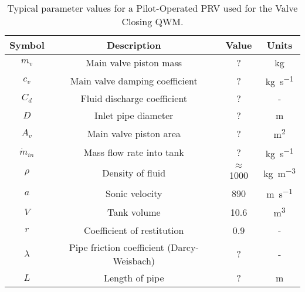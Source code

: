 \begin{table}[ht]
    \centering
    \begin{tabular}{c|c|c|c}
        Symbol & Description & Value & Units \\ \hline \hline
        $m_v$ & Main valve piston mass & ? & \si{kg} \\ \hline %
        $c_v$ & Main valve damping coefficient & ? & \si{kg.s^{-1}} \\ \hline %
        $C_d$ & Fluid discharge coefficient & ? & - \\ \hline %
        $D$ & Inlet pipe diameter & ? & \si{m} \\ \hline %
        $A_v$ & Main valve piston area & ? & \si{m^2} \\ \hline
        $\dot{m}_{in}$ & Mass flow rate into tank & ? & \si{kg.s^{-1}} \\ \hline %
        $\rho$ & Density of fluid & $\approx$1000 & \si{kg.m^{-3}} \\ \hline %
        $a$ & Sonic velocity & 890 & \si{m.s^{-1}} \\ \hline %
        $V$ & Tank volume & 10.6 & \si{m^3} \\ \hline %
        $r$ & Coefficient of restitution & 0.9 & - \\ \hline %
        $\lambda$ & Pipe friction coefficient (Darcy-Weisbach) & ? & - \\ \hline %
        $L$ & Length of pipe & ? & \si{m} \\ %
    \end{tabular}
    \caption{Typical parameter values for a Pilot-Operated PRV used for the Valve Closing QWM.}
    \label{tab: ValveClosingQWMParameterValues}
\end{table}